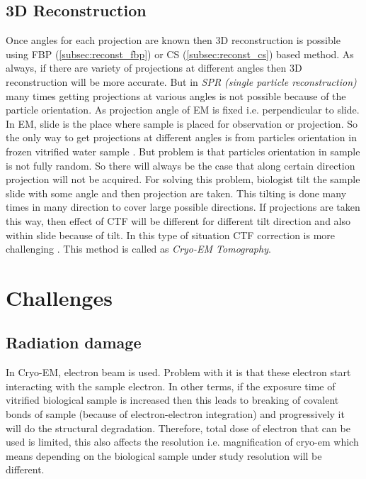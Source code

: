 \documentclass{report}
\begin{document}
\subsection{3D Reconstruction}
Once angles for each projection are known then 3D reconstruction is possible using FBP (\ref{subsec:reconst_fbp}) or CS (\ref{subsec:reconst_cs}) based method. As always, if there are variety of projections at different angles then 3D reconstruction will be more accurate. But in \textit{SPR (single particle reconstruction)} \cite{sigworth2016principles} many times getting projections at various  angles is not possible because of the particle orientation. As projection angle of EM is fixed i.e. perpendicular to slide. In EM, slide is the place where sample is placed for observation or projection. So the only way to get projections at different angles is from particles orientation in frozen vitrified water sample \cite{diebolder2012pushing}. But problem is that particles orientation in sample is not fully random. So there will always be the case that along certain direction projection will not be acquired. For solving this problem, biologist tilt the sample slide with some angle and then projection are taken. This tilting is done many times in many direction to cover large possible directions. If projections are taken this way, then effect of CTF will be different for different tilt direction and also within slide because of tilt. In this type of situation CTF correction is more challenging \cite{diebolder2012pushing}. This method is called as \textit{Cryo-EM Tomography}.

\section{Challenges}
\subsection{Radiation damage}
In Cryo-EM, electron beam is used. Problem with it is that these electron start interacting with the sample electron. In other terms, if the exposure time of vitrified biological sample is increased then this leads to breaking of covalent bonds of sample (because of electron-electron integration) and progressively it will do the structural degradation\cite{diebolder2012pushing}. Therefore, total dose of electron that can be used is limited, this also affects the resolution i.e. magnification of cryo-em which means depending on the biological sample under study resolution will be different.
\end{document}
